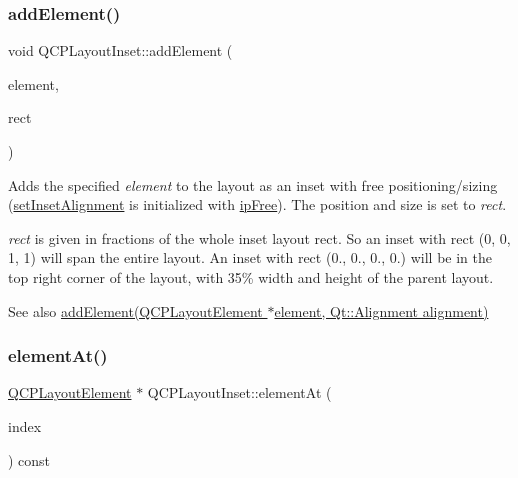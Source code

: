 \subsubsection{\texorpdfstring{add\+Element()}{addElement()}\hspace{0.1cm}{\footnotesize\ttfamily [2/2]}}
{\footnotesize\ttfamily void Q\+C\+P\+Layout\+Inset\+::add\+Element (\begin{DoxyParamCaption}\item[{\hyperlink{classQCPLayoutElement}{Q\+C\+P\+Layout\+Element} $\ast$}]{element,  }\item[{const Q\+RectF \&}]{rect }\end{DoxyParamCaption})}

Adds the specified {\itshape element} to the layout as an inset with free positioning/sizing (\hyperlink{classQCPLayoutInset_a62882a4f9ad58bb0f53da12fde022abe}{set\+Inset\+Alignment} is initialized with \hyperlink{classQCPLayoutInset_a8b9e17d9a2768293d2a7d72f5e298192aa4802986ea2cea457f932b115acba59e}{ip\+Free}). The position and size is set to {\itshape rect}.

{\itshape rect} is given in fractions of the whole inset layout rect. So an inset with rect (0, 0, 1, 1) will span the entire layout. An inset with rect (0., 0., 0., 0.) will be in the top right corner of the layout, with 35\% width and height of the parent layout.

\begin{DoxySeeAlso}{See also}
\hyperlink{classQCPLayoutInset_ad61529eb576af7f04dff94abb10c745a}{add\+Element(\+Q\+C\+P\+Layout\+Element $\ast$element, Qt\+::\+Alignment alignment)} 
\end{DoxySeeAlso}
\mbox{\label{classQCPLayoutInset_a881ca205605bae9c034733b808f93a02}} 
\subsubsection{\texorpdfstring{element\+At()}{elementAt()}}
{\footnotesize\ttfamily \hyperlink{classQCPLayoutElement}{Q\+C\+P\+Layout\+Element} $\ast$ Q\+C\+P\+Layout\+Inset\+::element\+At (\begin{DoxyParamCaption}\item[{int}]{index }\end{DoxyParamCaption}) const\hspace{0.3cm}{\ttfamily [virtual]}}

